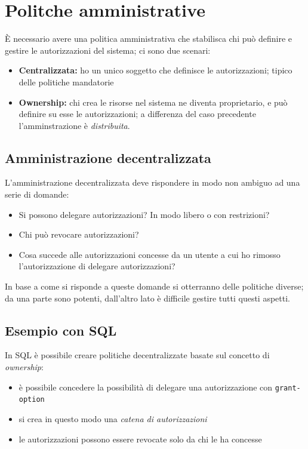 \documentclass{report}
\begin{document}
\chapter{Politche amministrative}
È necessario avere una politica amministrativa che stabilisca chi può definire e gestire 
le autorizzazioni del sistema; ci sono due scenari:
\begin{itemize}
    \item \textbf{Centralizzata:} ho un unico soggetto che definisce le autorizzazioni; tipico 
    delle politiche mandatorie 
    \item \textbf{Ownership:} chi crea le risorse nel sistema ne diventa proprietario, e può definire 
    su esse le autorizzazioni; a differenza del caso precedente l'amminstrazione è \textit{distribuita}.
\end{itemize}

\section{Amministrazione decentralizzata}
L'amministrazione decentralizzata deve rispondere in modo non ambiguo ad una serie 
di domande:
\begin{itemize}
    \item Si possono delegare autorizzazioni? In modo libero o con restrizioni? 
    \item Chi può revocare autorizzazioni? 
    \item Cosa succede alle autorizzazioni concesse da un utente a cui ho rimosso 
    l'autorizzazione di delegare autorizzazioni?
\end{itemize}

\noindent In base a come si risponde a queste domande si otterranno delle politiche diverse; 
da una parte sono potenti, dall'altro lato è difficile gestire tutti questi aspetti.

\section{Esempio con SQL}
In SQL è possibile creare politiche decentralizzate basate sul concetto di \textit{ownership}:
\begin{itemize}
    \item è possibile concedere la possibilità di delegare una autorizzazione con \texttt{grant-option}
    \item si crea in questo modo una \textit{catena di autorizzazioni}
    \item le autorizzazioni possono essere revocate solo da chi le ha concesse 
\end{itemize}
\end{document}
